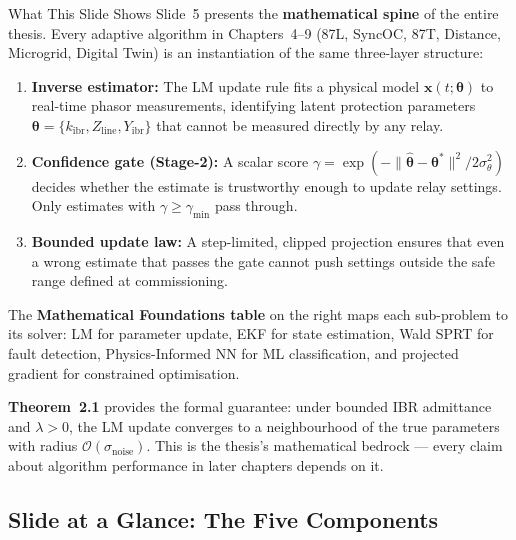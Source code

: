 \documentclass[12pt,a4paper]{article}
\newcommand{\kibr}{k_\mathrm{ibr}}
\newcommand{\thetahat}{\hat{\bm{\theta}}}
\newcommand{\thetastar}{\bm{\theta}^*}
\newcommand{\gmin}{\gamma_\mathrm{min}}
\newcommand{\sigth}{\sigma_\theta}
\begin{document}
\begin{keybox}{What This Slide Shows}
Slide~5 presents the \textbf{mathematical spine} of the entire thesis.  Every
adaptive algorithm in Chapters~4--9 (87L, SyncOC, 87T, Distance, Microgrid,
Digital Twin) is an instantiation of the same three-layer structure:

\begin{enumerate}[nosep]
  \item \textbf{Inverse estimator:} The LM update rule fits a physical model
        $\mathbf{x}(t;\bm{\theta})$ to real-time phasor measurements, identifying
        latent protection parameters $\bm{\theta} = \{\kibr, Z_\mathrm{line}, Y_\mathrm{ibr}\}$
        that cannot be measured directly by any relay.
  \item \textbf{Confidence gate (Stage-2):}  A scalar score
        $\gamma = \exp\!\left(-\|\thetahat - \thetastar\|^2/2\sigth^2\right)$
        decides whether the estimate is trustworthy enough to update relay settings.
        Only estimates with $\gamma \geq \gmin$ pass through.
  \item \textbf{Bounded update law:} A step-limited, clipped projection ensures
        that even a wrong estimate that passes the gate cannot push settings outside
        the safe range defined at commissioning.
\end{enumerate}

The \textbf{Mathematical Foundations table} on the right maps each
sub-problem to its solver: LM for parameter update, EKF for state estimation,
Wald SPRT for fault detection, Physics-Informed NN for ML classification, and
projected gradient for constrained optimisation.

\textbf{Theorem~2.1} provides the formal guarantee: under bounded IBR admittance
and $\lambda > 0$, the LM update converges to a neighbourhood of the true
parameters with radius $\mathcal{O}(\sigma_\mathrm{noise})$.  This is the
thesis's mathematical bedrock --- every claim about algorithm performance
in later chapters depends on it.
\end{keybox}

\subsection{Slide at a Glance: The Five Components}
\end{document}
